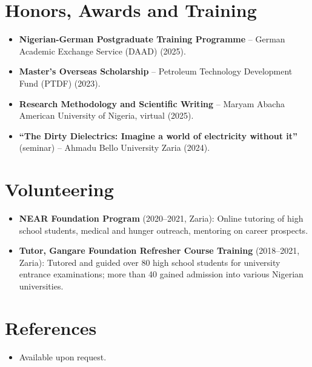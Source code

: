 \documentclass[11pt,a4paper,sans]{moderncv}
\begin{document}
\section{Honors, Awards and Training}
\vspace{1pt}
\begin{itemize}
\item{\textbf{Nigerian-German Postgraduate Training Programme} -- German Academic Exchange Service (DAAD) (2025).}
\item{\textbf{Master's Overseas Scholarship} -- Petroleum Technology Development Fund (PTDF) (2023).}
\item{\textbf{Research Methodology and Scientific Writing} -- Maryam Abacha American University of Nigeria, virtual (2025).}
\item{\textbf{``The Dirty Dielectrics: Imagine a world of electricity without it''} (seminar) -- Ahmadu Bello University Zaria (2024).}
\end{itemize}


\section{Volunteering}
\vspace{1pt}
\begin{itemize}
\item{\textbf{NEAR Foundation Program} (2020--2021, Zaria): Online tutoring of high school students, medical and hunger outreach, mentoring on career prospects.}
\item{\textbf{Tutor, Gangare Foundation Refresher Course Training} (2018--2021, Zaria): Tutored and guided over 80 high school students for university entrance examinations; more than 40 gained admission into various Nigerian universities.}
\end{itemize}


\section{References}
\vspace{1pt}
\begin{itemize}
\item{Available upon request.}
\end{itemize}
\end{document}
